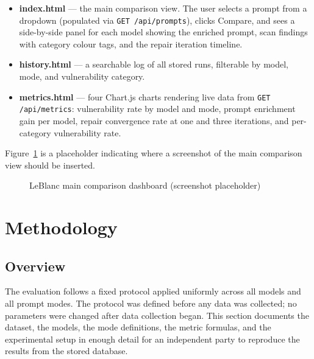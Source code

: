 \documentclass[12pt,a4paper]{report}
\begin{document}
\begin{itemize}
  \item \textbf{index.html} --- the main comparison view. The user selects a
        prompt from a dropdown (populated via \texttt{GET /api/prompts}), clicks
        Compare, and sees a side-by-side panel for each model showing the
        enriched prompt, scan findings with category colour tags, and the repair
        iteration timeline.
  \item \textbf{history.html} --- a searchable log of all stored runs, filterable
        by model, mode, and vulnerability category.
  \item \textbf{metrics.html} --- four Chart.js charts rendering live data from
        \texttt{GET /api/metrics}: vulnerability rate by model and mode, prompt
        enrichment gain per model, repair convergence rate at one and three
        iterations, and per-category vulnerability rate.
\end{itemize}

Figure~\ref{fig:uiflow} is a placeholder indicating where a screenshot of the
main comparison view should be inserted.

\begin{figure}[H]
\centering
{}
\caption{LeBlanc main comparison dashboard (screenshot placeholder)}
\label{fig:uiflow}
\end{figure}

\chapter{Methodology}
\label{ch:methodology}

\section{Overview}
\label{sec:methodoview}

The evaluation follows a fixed protocol applied uniformly across all models and
all prompt modes. The protocol was defined before any data was collected; no
parameters were changed after data collection began. This section documents the
dataset, the models, the mode definitions, the metric formulas, and the
experimental setup in enough detail for an independent party to reproduce the
results from the stored database.
\end{document}
